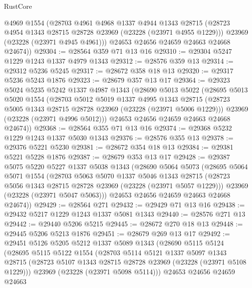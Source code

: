 \begin{lexlean}{RustCore}
\begin{coremodule}
        @4969
        @1554
        (@28703
          @4961
          @4968
          @1337
          @4944
          @1343
          @28715
          (@28723 @4954 @1343 @28715 @28728 @23969 (@23228 (@23971 @4955 @1229)))
          @23969
          (@23228 (@23971 @4945 @4961)))
        @24653
        @24656
        @24659
        @24663
        @24668
        @24674))
@29304 := @28564 @359 @71 @13 @16
@29310 := @29304 @5247 @1229 @1243 @1337 @4979 @1343
@29312 := @28576 @359 @13
@29314 := @29312 @5236 @5245
@29317 := @28672 @358 @18 @13
@29320 := @29317 @5236 @5243 @1876
@29323 := @28679 @357 @13 @17
@29364 := @29323
    @5024
    @5235
    @5242
    @1337
    @4987
    @1343
    (@28690
      @5013
      @5022
      (@28695
        @5013
        @5020
        @1554
        (@28703
          @5012
          @5019
          @1337
          @4995
          @1343
          @28715
          (@28723 @5005 @1343 @28715 @28728 @23969 (@23228 (@23971 @5006 @1229)))
          @23969
          (@23228 (@23971 @4996 @5012)))
        @24653
        @24656
        @24659
        @24663
        @24668
        @24674))
@29368 := @28564 @355 @71 @13 @16
@29374 := @29368 @5232 @1229 @1243 @1337 @5030 @1343
@29376 := @28576 @355 @13
@29378 := @29376 @5221 @5230
@29381 := @28672 @354 @18 @13
@29384 := @29381 @5221 @5228 @1876
@29387 := @28679 @353 @13 @17
@29428 := @29387
    @5075
    @5220
    @5227
    @1337
    @5038
    @1343
    (@28690
      @5064
      @5073
      (@28695
        @5064
        @5071
        @1554
        (@28703
          @5063
          @5070
          @1337
          @5046
          @1343
          @28715
          (@28723 @5056 @1343 @28715 @28728 @23969 (@23228 (@23971 @5057 @1229)))
          @23969
          (@23228 (@23971 @5047 @5063)))
        @24653
        @24656
        @24659
        @24663
        @24668
        @24674))
@29429 := @28564 @271
@29432 := @29429 @71 @13 @16
@29438 := @29432 @5217 @1229 @1243 @1337 @5081 @1343
@29440 := @28576 @271 @13
@29442 := @29440 @5206 @5215
@29445 := @28672 @270 @18 @13
@29448 := @29445 @5206 @5213 @1876
@29451 := @28679 @269 @13 @17
@29492 := @29451
    @5126
    @5205
    @5212
    @1337
    @5089
    @1343
    (@28690
      @5115
      @5124
      (@28695
        @5115
        @5122
        @1554
        (@28703
          @5114
          @5121
          @1337
          @5097
          @1343
          @28715
          (@28723 @5107 @1343 @28715 @28728 @23969 (@23228 (@23971 @5108 @1229)))
          @23969
          (@23228 (@23971 @5098 @5114)))
        @24653
        @24656
        @24659
        @24663

\end{coremodule}
\end{lexlean}
